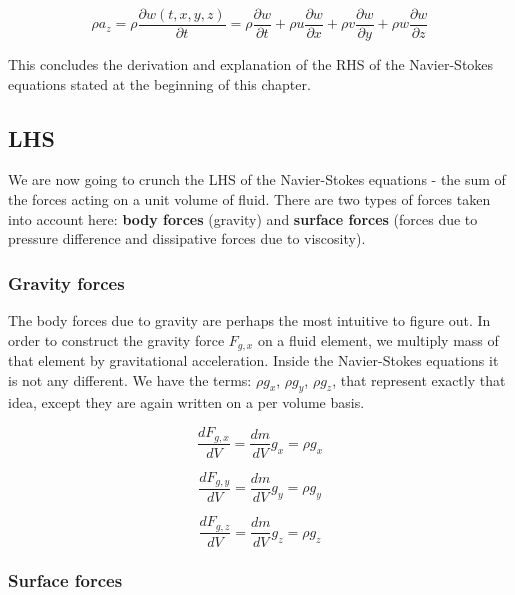 \begin{equation}
\rho a_z = \rho \frac{\partial w(t,x,y,z)}{\partial t} = \rho \frac{\partial w}{\partial t} + \rho u \frac{\partial w}{\partial x} + \rho v \frac{\partial w}{\partial y} + \rho w \frac{\partial w}{\partial z}
\end{equation}

This concludes the derivation and explanation of the RHS of the Navier-Stokes equations stated at the beginning of this chapter.


\subsection{LHS}

We are now going to crunch the LHS of the Navier-Stokes equations - the sum of the forces acting on a unit volume of fluid. There are two types of forces taken into account here: \textbf{body forces} (gravity) and \textbf{surface forces} (forces due to pressure difference and dissipative forces due to viscosity).

\subsubsection{Gravity forces}

The body forces due to gravity are perhaps the most intuitive to figure out. In order to construct the gravity force $F_{g, x}$ on a fluid element, we multiply mass of that element by gravitational acceleration. Inside the Navier-Stokes equations it is not any different. We have the terms: $\rho g_x$, $\rho g_y$, $\rho g_z$, that represent exactly that idea, except they are again written on a per volume basis.

\begin{equation}
\frac{d F_{g, x}}{dV} = \frac{dm}{dV} g_x =  \rho g_x
\end{equation}

\begin{equation}
\frac{d F_{g, y}}{dV} = \frac{dm}{dV} g_y =  \rho g_y
\end{equation}

\begin{equation}
\frac{d F_{g, z}}{dV} = \frac{dm}{dV} g_z =  \rho g_z
\end{equation}

\subsubsection{Surface forces}

